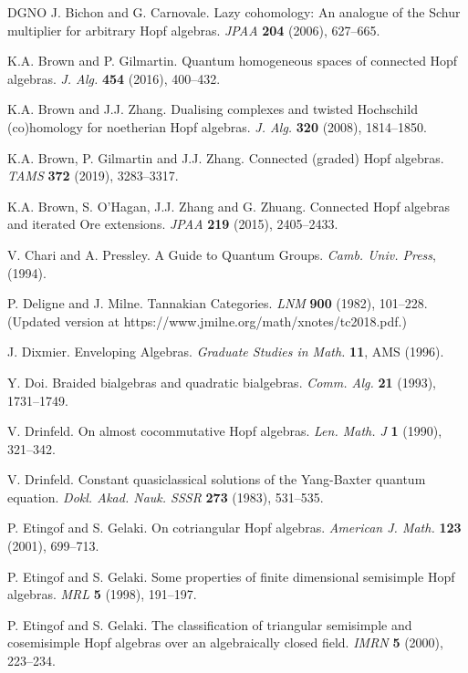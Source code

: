 \documentclass{amsart}
\numberwithin{equation}{section}
\theoremstyle{definition}
\begin{document}
\begin{thebibliography}{DGNO}
 J. Bichon and G. Carnovale. Lazy cohomology: An analogue of the Schur multiplier for arbitrary Hopf algebras. {\em JPAA} {\bf 204} (2006), 627--665.

 K.A. Brown and P. Gilmartin. Quantum homogeneous spaces of connected Hopf algebras. {\em J. Alg.} {\bf 454} (2016), 400--432.

 K.A. Brown and J.J. Zhang. Dualising complexes and twisted Hochschild
(co)homology for noetherian Hopf algebras. {\em J. Alg.} {\bf 320} (2008), 1814--1850.

 K.A. Brown, P. Gilmartin and J.J. Zhang. Connected (graded) Hopf algebras. {\em TAMS} {\bf 372} (2019), 3283--3317.

 K.A. Brown, S. O'Hagan, J.J. Zhang and G. Zhuang. Connected Hopf algebras and iterated Ore extensions. {\em JPAA} {\bf 219} (2015), 2405--2433.

 V. Chari and A. Pressley. A Guide to Quantum Groups. \emph{Camb. Univ. Press}, (1994).

 P. Deligne and J. Milne. Tannakian Categories.  
{\em LNM} {\bf 900} (1982), 101--228.
(Updated version at https://www.jmilne.org/math/xnotes/tc2018.pdf.)

 J. Dixmier. Enveloping Algebras. \emph{Graduate Studies in Math.} {\bf 11}, AMS (1996).

 Y. Doi. Braided bialgebras and quadratic bialgebras. {\em Comm. Alg.} {\bf 21} (1993), 1731--1749.

 V. Drinfeld. On almost cocommutative Hopf algebras. {\em Len. Math. J} {\bf 1} (1990), 321--342.

 V. Drinfeld. Constant quasiclassical solutions of the Yang-Baxter quantum equation. {\em Dokl. Akad. Nauk. SSSR} {\bf 273} (1983), 531--535.

 P. Etingof and S. Gelaki. On cotriangular Hopf algebras. {\em
American J. Math.} {\bf 123} (2001), 699--713.

 P. Etingof and S. Gelaki. Some properties of finite dimensional
semisimple Hopf algebras. {\em MRL} {\bf
5} (1998), 191--197.

 P. Etingof and S. Gelaki. The classification of triangular
semisimple and cosemisimple Hopf algebras over an algebraically
closed field. {\em IMRN} {\bf
5} (2000), 223--234.


\end{thebibliography}
\end{document}
